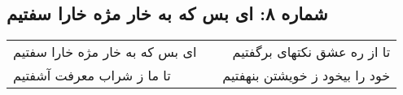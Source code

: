 \begin{center}
\section*{شماره ۸: ای بس که به خار مژه خارا سفتیم}
\label{sec:008}
\begin{longtable}{l p{0.5cm} r}
ای بس که به خار مژه خارا سفتیم
&&
تا از ره عشق نکتهای برگفتیم
\\
تا ما ز شراب معرفت آشفتیم
&&
خود را بیخود ز خویشتن بنهفتیم
\\
\end{longtable}
\end{center}
